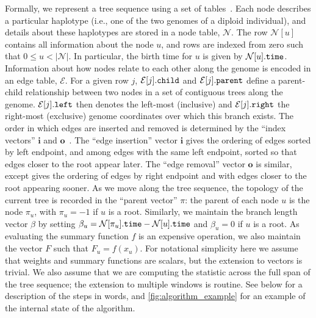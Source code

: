\documentclass{article}
\newcommand{\Nt}{\mathcal{N}}  %
\newcommand{\Et}{\mathcal{E}}  %
\newcommand{\prop}[1]{.\mbox{\texttt{#1}}} %
\newcommand{\indexin}[0]{\ensuremath{\mathbf{i}}}
\newcommand{\indexout}[0]{\ensuremath{\mathbf{o}}}
\begin{document}
Formally, we represent a tree sequence using a set of tables~\citep{kelleher2018efficient}.
Each node describes a particular haplotype (i.e., one of the two genomes of a diploid individual),
and details about these haplotypes are stored in a node table, $\Nt$.
The row $\Nt[u]$ contains all information about the node $u$, and rows
are indexed from zero such that $0 \leq u < |\Nt|$.
In particular, the birth time for $u$ is given by $\Nt[u]\prop{time}$.
Information about how nodes relate to each
other along the genome is encoded in an edge table, $\Et$.
For a given row $j$, $\Et[j]\prop{child}$ and $\Et[j]\prop{parent}$
define a parent-child relationship between two nodes in a set of
contiguous trees along the genome. $\Et[j]\prop{left}$ then denotes
the left-most (inclusive) and $\Et[j]\prop{right}$ the right-most
(exclusive) genome coordinates over which this branch exists.
The order in which edges are inserted and removed is determined
by the ``index vectors'' $\indexin$ and $\indexout$~\citep{kelleher2016efficient}.
The ``edge insertion'' vector $\indexin$ gives the ordering of edges
sorted by left endpoint, and among edges with the same left endpoint,
sorted so that edges closer to the root appear later.
The ``edge removal'' vector $\indexout$ is similar, except gives the ordering of edges
by right endpoint and with edges closer to the root appearing sooner.
As we move along the tree sequence, the topology of the current tree is recorded in the
``parent vector'' $\pi$: the parent of each node $u$ is the node $\pi_u$,
with $\pi_u = -1$ if $u$ is a root.
Similarly, we maintain the branch length vector $\beta$ by setting
$\beta_u = \Nt[\pi_u]\prop{time} - \Nt[u]\prop{time}$ and
$\beta_u = 0$ if $u$ is a root. As evaluating the summary function
$f$ is an expensive operation, we also maintain the vector $F$
such that $F_u = f(x_u)$. For notational simplicity here we assume
that weights and summary functions are scalars, but the extension to
vectors is trivial. We also assume that we are computing the statistic
across the full span of the tree sequence; the extension to multiple windows is routine.
See below for a description of the steps in words,
and \autoref{fig:algorithm_example} for an example of the internal state of the algorithm.
\end{document}

